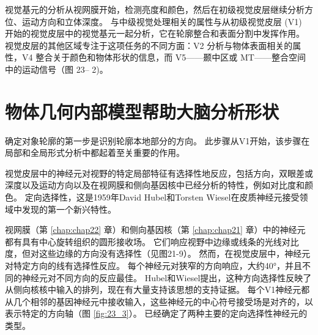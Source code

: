 视觉基元的分析从视网膜开始，检测亮度和颜色，然后在初级视觉皮层继续分析方位、运动方向和立体深度。
与中级视觉处理相关的属性与从初级视觉皮层 (V1) 开始的视觉皮层中的视觉基元一起分析，它在轮廓整合和表面分割中发挥作用。
视觉皮层的其他区域专注于这项任务的不同方面：V2 分析与物体表面相关的属性，V4 整合关于颜色和物体形状的信息，而 V5——颞中区或 MT——整合空间中的运动信号（图 23– 2)。


\section{物体几何内部模型帮助大脑分析形状}

确定对象轮廓的第一步是识别轮廓本地部分的方向。
此步骤从V1开始，该步骤在局部和全局形式分析中都起着至关重要的作用。


视觉皮层中的神经元对视野的特定局部特征有选择性地反应，包括方向，双眼差或深度以及运动方向以及在视网膜和侧向基因核中已经分析的特性，例如对比度和颜色。 
定向选择性，这是1959年David Hubel和Torsten Wiesel在皮质神经元接受领域中发现的第一个新兴特性。


视网膜（第  \ref{chap:chap22} 章）和侧向基因核（第 \ref{chap:chap21} 章）中的神经元都有具有中心旋转组织的圆形接收场。 
它们响应视野中边缘或线条的光线对比度，但对这些边缘的方向没有选择性（见图21-9）。 
然而，在视觉皮层中，神经元对特定方向的线有选择性反应。 每个神经元对狭窄的方向响应，大约40°，并且不同的神经元对不同方向的反应最佳。 
Hubel和Wiesel提出，这种方向选择性反映了从侧向核核中输入的排列，现在有大量支持该思想的支持证据。 
每个V1神经元都从几个相邻的基因神经元中接收输入，这些神经元的中心符号接受场是对齐的，以表示特定的方向轴（图 \ref{fig:23_3}）。
已经确定了两种主要的定向选择性神经元的类型。

